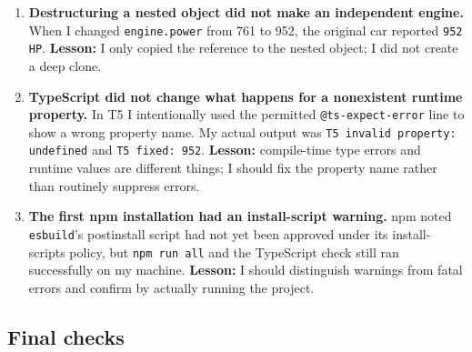 \documentclass[
  9pt,
]{article}
\newcommand{\passthrough}[1]{#1}
\begin{document}
\begin{enumerate}
{  \passthrough{\lstinline!null!} looked similar but behaved
  differently.} My Pitfall 2 output was
  \passthrough{\lstinline!Black null!}. In P6,
  \passthrough{\lstinline!undefined!} displayed
  \passthrough{\lstinline!Unknown car!} while
  \passthrough{\lstinline!null!} rendered an empty span.
  \textbf{Lesson:} defaults are triggered by
  \passthrough{\lstinline!undefined!}, not every missing-looking value.
\item
  \textbf{Destructuring a nested object did not make an independent
  engine.} When I changed \passthrough{\lstinline!engine.power!} from
  761 to 952, the original car reported
  \passthrough{\lstinline!952 HP!}. \textbf{Lesson:} I only copied the
  reference to the nested object; I did not create a deep clone.
\item
  \textbf{TypeScript did not change what happens for a nonexistent
  runtime property.} In T5 I intentionally used the permitted
  \passthrough{\lstinline!@ts-expect-error!} line to show a wrong
  property name. My actual output was
  \passthrough{\lstinline!T5 invalid property: undefined!} and
  \passthrough{\lstinline!T5 fixed: 952!}. \textbf{Lesson:} compile-time
  type errors and runtime values are different things; I should fix the
  property name rather than routinely suppress errors.
\item
  \textbf{The first npm installation had an install-script warning.} npm
  noted \passthrough{\lstinline!esbuild!}'s postinstall script had not
  yet been approved under its install-scripts policy, but
  \passthrough{\lstinline!npm run all!} and the TypeScript check still
  ran successfully on my machine. \textbf{Lesson:} I should distinguish
  warnings from fatal errors and confirm by actually running the
  project.
\end{enumerate}

\subsection{Final checks}\label{final-checks}
\end{document}

